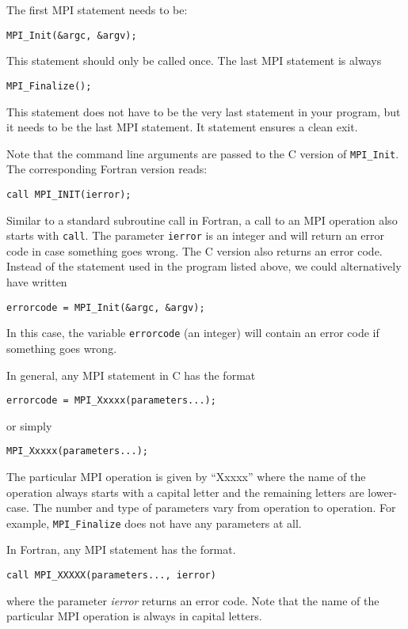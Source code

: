 The first MPI statement needs to be:
\begin{lstlisting}[style=c]
  MPI_Init(&argc, &argv);
\end{lstlisting}
This statement should only be called once. The last MPI statement is always
\begin{lstlisting}[style=c]
  MPI_Finalize();
\end{lstlisting}
This statement does not have to be the very last statement in your program, but
it needs to be the last MPI statement. It statement ensures a clean exit.

Note that the command line arguments are passed to the C version of
\texttt{MPI\_Init}. The corresponding Fortran version reads:
\begin{lstlisting}[style=fortran]
  call MPI_INIT(ierror);
\end{lstlisting}
Similar to a standard subroutine call in Fortran, a call to an MPI operation
also starts with \texttt{call}. The parameter \texttt{ierror} is an integer and
will return an error code in case something goes wrong. The C version also
returns an error code. Instead of the statement used in the program listed
above, we could alternatively have written
\begin{lstlisting}[style=c]
  errorcode = MPI_Init(&argc, &argv);
\end{lstlisting}
In this case, the variable \texttt{errorcode} (an integer) will contain an error
code if something goes wrong.

In general, any MPI statement in C has the format
\begin{lstlisting}[style=c]
  errorcode = MPI_Xxxxx(parameters...);
\end{lstlisting}
or simply
\begin{lstlisting}[style=c]
  MPI_Xxxxx(parameters...);
\end{lstlisting}
The particular MPI operation is given by ``Xxxxx'' where the name of the operation
always starts with a capital letter and the remaining letters are lower-case.
The number and type of parameters vary from operation to operation. For example,
\texttt{MPI\_Finalize} does not have any parameters at all.

In Fortran, any MPI statement has the format.
\begin{lstlisting}[style=c]
  call MPI_XXXXX(parameters..., ierror)
\end{lstlisting}
where the parameter \emph{ierror} returns an error code. Note that the name of
the particular MPI operation is always in capital letters.

